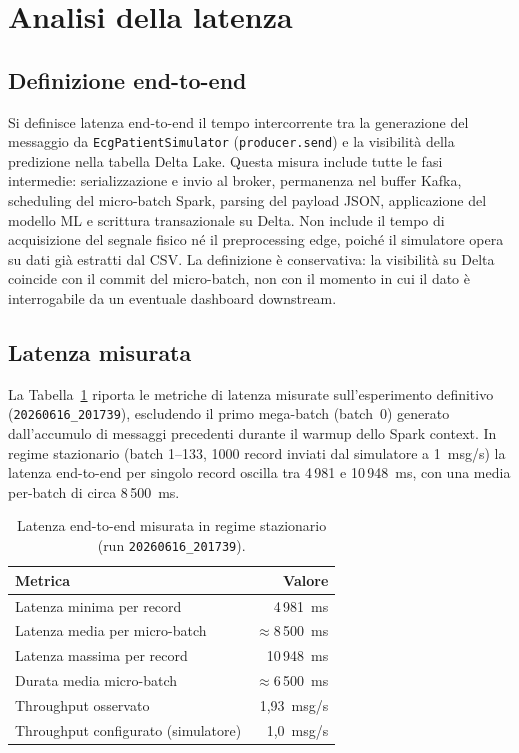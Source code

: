 \section{Analisi della latenza}\label{sec:analisi-latenza}

\subsection{Definizione end-to-end}

Si definisce latenza end-to-end il tempo intercorrente tra la generazione del messaggio da \texttt{EcgPatientSimulator} (\texttt{producer.send}) e la visibilità della predizione nella tabella Delta Lake.
Questa misura include tutte le fasi intermedie: serializzazione e invio al broker, permanenza nel buffer Kafka, scheduling del micro-batch Spark, parsing del payload JSON, applicazione del modello ML e scrittura transazionale su Delta.
Non include il tempo di acquisizione del segnale fisico né il preprocessing edge, poiché il simulatore opera su dati già estratti dal CSV.
La definizione è conservativa: la visibilità su Delta coincide con il commit del micro-batch, non con il momento in cui il dato è interrogabile da un eventuale dashboard downstream.

\subsection{Latenza misurata}

La Tabella~\ref{tab:latenza} riporta le metriche di latenza misurate sull'esperimento definitivo (\texttt{20260616\_201739}), escludendo il primo mega-batch (batch~0) generato dall'accumulo di messaggi precedenti durante il warmup dello Spark context.
In regime stazionario (batch 1--133, 1000 record inviati dal simulatore a 1~msg/s) la latenza end-to-end per singolo record oscilla tra 4\,981 e 10\,948~ms, con una media per-batch di circa 8\,500~ms.

\begin{table}[H]
  \centering
  \caption{Latenza end-to-end misurata in regime stazionario (run \texttt{20260616\_201739}).}
  \label{tab:latenza}
  \begin{tabular}{@{}lr@{}}
    \toprule
    \textbf{Metrica} & \textbf{Valore} \\
    \midrule
    Latenza minima per record & 4\,981~ms \\
    Latenza media per micro-batch & $\approx$8\,500~ms \\
    Latenza massima per record & 10\,948~ms \\
    Durata media micro-batch & $\approx$6\,500~ms \\
    Throughput osservato & 1,93~msg/s \\
    Throughput configurato (simulatore) & 1,0~msg/s \\
    \bottomrule
  \end{tabular}
\end{table}


